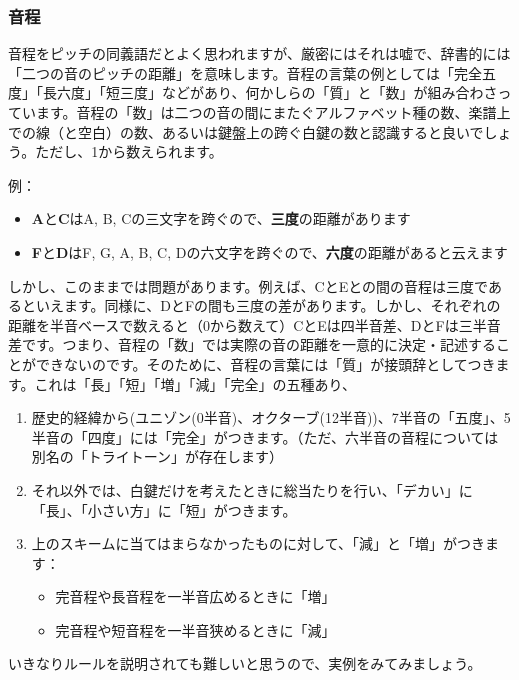 \documentclass[11pt]{ltjarticle}
\begin{document}
\subsubsection{音程}
音程をピッチの同義語だとよく思われますが、厳密にはそれは嘘で、辞書的には「二つの音のピッチの距離」を意味します。音程の言葉の例としては「完全五度」「長六度」「短三度」などがあり、何かしらの「質」と「数」が組み合わさっています。音程の「数」は二つの音の間にまたぐアルファベット種の数、楽譜上での線（と空白）の数、あるいは鍵盤上の跨ぐ白鍵の数と認識すると良いでしょう。ただし、1から数えられます。\par
例：
\begin{itemize}
    \item \textbf{A}と\textbf{C}はA, B, Cの三文字を跨ぐので、\textbf{三度}の距離があります
    \item \textbf{F}\sh と\textbf{D}\sh はF, G, A, B, C, Dの六文字を跨ぐので、\textbf{六度}の距離があると云えます
\end{itemize}\par
しかし、このままでは問題があります。例えば、CとEとの間の音程は三度であるといえます。同様に、DとFの間も三度の差があります。しかし、それぞれの距離を半音ベースで数えると（0から数えて）CとEは四半音差、DとFは三半音差です。つまり、音程の「数」では実際の音の距離を一意的に決定・記述することができないのです。そのために、音程の言葉には「質」が接頭辞としてつきます。これは「長」「短」「増」「減」「完全」の五種あり、
\begin{enumerate}
    \item 歴史的経緯から(ユニゾン(0半音)、オクターブ(12半音))、7半音の「五度」、5半音の「四度」には「完全」がつきます。（ただ、六半音の音程については別名の「トライトーン」が存在します）
    \item それ以外では、白鍵だけを考えたときに総当たりを行い、「デカい」に「長」、「小さい方」に「短」がつきます。
    \item 上のスキームに当てはまらなかったものに対して、「減」と「増」がつきます：
    \begin{itemize}
        \item 完音程や長音程を一半音広めるときに「増」
        \item 完音程や短音程を一半音狭めるときに「減」
    \end{itemize}
\end{enumerate}
いきなりルールを説明されても難しいと思うので、実例をみてみましょう。
\end{document}
